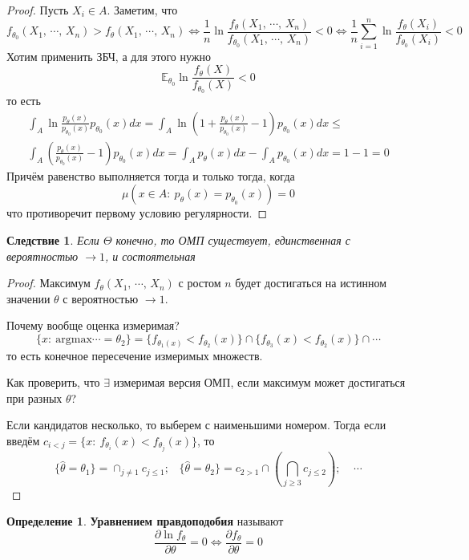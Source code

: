 \documentclass[a4paper,12pt]{article}
\renewcommand{\leq}{\ensuremath{\leqslant}}
\renewcommand{\geq}{\ensuremath{\geqslant}}
\theoremstyle{plain}
\newtheorem*{corollary}{Следствие}
\theoremstyle{definition}
\newtheorem{definition}{Определение}[section]
\theoremstyle{remark}
\begin{document}
\begin{proof}
  Пусть $X_i \in A$. Заметим, что
  \[
    f_{\theta_0}(X_1,\,\cdots,\,X_n) > f_\theta(X_1,\,\cdots,\,X_n) \Leftrightarrow \frac{1}{n}\ln\frac{f_\theta(X_1,\,\cdots,\,X_n)}{f_{\theta_0}(X_1,\,\cdots,\,X_n)} < 0 \Leftrightarrow \frac{1}{n}\sum_{i = 1}^n\ln\frac{f_\theta(X_i)}{f_{\theta_0}(X_i)} < 0
  \]
  Хотим применить ЗБЧ, а для этого нужно
  \[
    \mathbb{E}_{\theta_0}\ln\frac{f_\theta(X)}{f_{\theta_0}(X)} < 0
  \]
  то есть
  \begin{align*}
    \int_A\ln\frac{p_\theta(x)}{p_{\theta_0}(x)}p_{\theta_0}(x)dx = \int_A\ln\left(1 + \frac{p_\theta(x)}{p_{\theta_0}(x)} - 1\right)p_{\theta_0}(x)dx \leq\\
    \int_A\left(\frac{p_\theta(x)}{p_{\theta_0}(x)} - 1\right)p_{\theta_0}(x)dx = \int_Ap_\theta(x)dx - \int_Ap_{\theta_0}(x)dx = 1 - 1 = 0 
  \end{align*}
  Причём равенство выполняется тогда и только тогда, когда
  \[
    \mu(x \in A :\: p_\theta(x) = p_{\theta_0}(x)) = 0
  \]
  что противоречит первому условию регулярности.
\end{proof}

\begin{corollary}
  Если $\Theta$ конечно, то ОМП существует, единственная с вероятностью $\to 1$, и состоятельная
\end{corollary}

\begin{proof}
  Максимум $f_\theta(X_1,\,\cdots,\,X_n)$ с ростом $n$ будет достигаться на истинном значении $\theta$ с вероятностью $\to 1$.

  Почему вообще оценка измеримая?
  \[
    \{x :\: \text{argmax}\cdots = \theta_2\} = \{f_{\theta_1(x)} < f_{\theta_2}(x)\}\cap\{f_{\theta_3}(x) < f_{\theta_2}(x)\}\cap\cdots
  \]
  то есть конечное пересечение измеримых множеств.

  Как проверить, что $\exists$ измеримая версия ОМП, если максимум может достигаться при разных $\theta$?

  Если кандидатов несколько, то выберем с наименьшими номером. Тогда если введём $c_{i < j} = \{x :\: f_{\theta_i}(x) < f_{\theta_j}(x)\}$, то
  \[
    \{\hat{\theta} = \theta_1\} = \cap_{j \neq 1}c_{j \leq 1};\;\;\; \{\hat{\theta} = \theta_2\} = c_{2 > 1} \cap (\bigcap_{j \geq 3}c_{j \leq 2});\;\;\;\;\cdots
  \]
\end{proof}

\begin{definition}
  \textbf{Уравнением правдоподобия} называют
  \[
    \frac{\partial\ln f_\theta}{\partial\theta} = 0 \Leftrightarrow \frac{\partial f_\theta}{\partial\theta} = 0
  \]
\end{definition}
\end{document}
